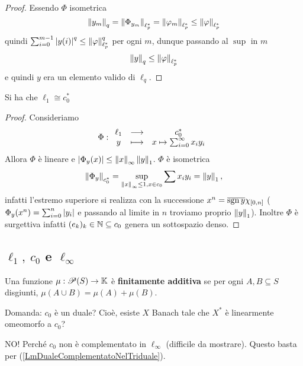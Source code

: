 \begin{proof}
Essendo $\Phi$ isometrica
\[\left\Vert{y_m}\right\Vert_q=\left\Vert{\Phi_{y_m}}\right\Vert_{\ell_p^\ast}=\left\Vert{\varphi_m}\right\Vert_{\ell_p^\ast}\leq \left\Vert{\varphi}\right\Vert_{\ell_p^\ast}\]
quindi $\sum_{i=0}^{m-1}\left|{y(i)}\right|^q\leq \left\Vert{\varphi}\right\Vert_{\ell_p^\ast}^q$ per ogni $m$, dunque passando al $\sup$ in $m$ 
\[\left\Vert{y}\right\Vert_q\leq \left\Vert{\varphi}\right\Vert_{\ell_p^\ast}\]
e quindi $y$ era un elemento valido di $\ell_q$.
\setlength{\leftmargini}{0.5cm}
\end{proof}


\begin{proposition}\label{PrDualec0El1}
Si ha che $\ell_1\cong c_0^\ast$
\end{proposition}
\begin{proof}
Consideriamo
\[\Phi:\begin{array}{ccc} {\ell_1} & \longrightarrow & {c_0^\ast}\\ {y} & \longmapsto & {x\mapsto \sum_{i=0}^\infty x_i y_i} \end{array}\]
Allora $\Phi$ \`e lineare e $\left|{\Phi_y(x)}\right|\leq \left\Vert{x}\right\Vert_\infty\left\Vert{y}\right\Vert_1$. $\Phi$ \`e isometrica
\[\left\Vert{\Phi_y}\right\Vert_{c_0^\ast}=\sup_{\left\Vert{x}\right\Vert_\infty\leq 1, x\in c_0}\sum x_i y_i=\left\Vert{y}\right\Vert_1,\]
infatti l'estremo superiore si realizza con la successione $x^n=\overline{\operatorname{sgn} y}\chi_{[0,n]}$ ($\Phi_y(x^n)=\sum_{i=0}^n\left|{y_i}\right|$ e passando al limite in $n$ troviamo proprio $\left\Vert{y}\right\Vert_1$). Inoltre $\Phi$ \`e surgettiva infatti $(e_k)_k\in\mathbb{N}\subseteq c_0$ genera un sottospazio denso.
\end{proof}

\subsection{\texorpdfstring{$\ell_1,\ c_0$}{l1, c0} e \texorpdfstring{$\ell_\infty$}{linf}}
\begin{definition}
Una funzione $\mu:\mathscr{P}(S)\to\mathbb{K}$ \`e \textbf{finitamente additiva} se per ogni $A,B\subseteq S$ disgiunti, $\mu(A\cup B)=\mu(A)+\mu(B)$.
\end{definition}

\begin{remark}
Domanda: $c_0$ \`e un duale? Cio\`e, esiste $X$ Banach tale che $X^\ast$ \`e linearmente omeomorfo a $c_0$?

NO! Perch\'e $c_0$ non \`e complementato in $\ell_\infty$ (difficile da mostrare). Questo basta per (\ref{LmDualeComplementatoNelTriduale}).
\end{remark}

